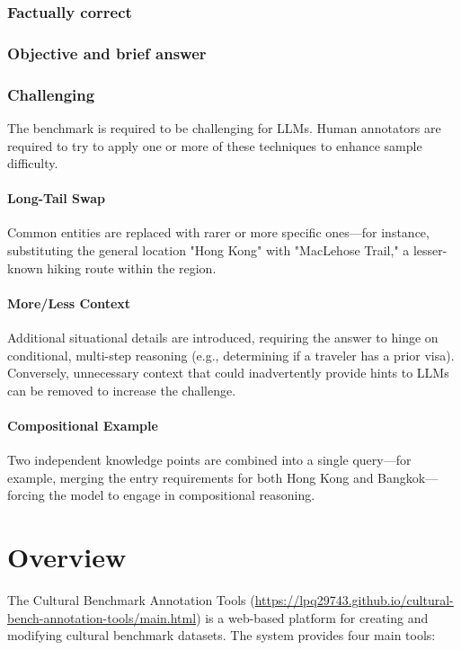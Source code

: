 \documentclass[11pt]{article}
\begin{document}
\subsubsection{Factually correct}

\subsubsection{Objective and brief answer}

\subsubsection{Challenging}

The benchmark is required to be challenging for LLMs. Human annotators are required to try to apply one or more of these techniques to enhance sample difficulty.

\paragraph{Long-Tail Swap}
Common entities are replaced with rarer or more specific ones—for instance, substituting the general location "Hong Kong" with "MacLehose Trail," a lesser-known hiking route within the region.

\paragraph{More/Less Context}
Additional situational details are introduced, requiring the answer to hinge on conditional, multi-step reasoning (e.g., determining if a traveler has a prior visa). Conversely, unnecessary context that could inadvertently provide hints to LLMs can be removed to increase the challenge.

\paragraph{Compositional Example}
Two independent knowledge points are combined into a single query—for example, merging the entry requirements for both Hong Kong and Bangkok—forcing the model to engage in compositional reasoning.


\section{Overview}

The Cultural Benchmark Annotation Tools (\url{https://lpq29743.github.io/cultural-bench-annotation-tools/main.html}) is a web-based platform for creating and modifying cultural benchmark datasets. The system provides four main tools:
\end{document}
